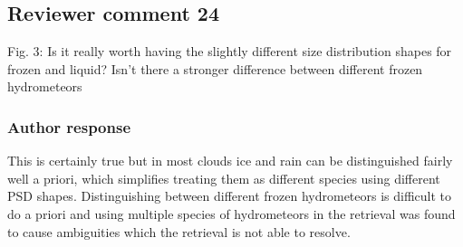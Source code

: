 \documentclass[11pt]{scrartcl}
\begin{document}
%
%
%


\subsection*{Reviewer comment 24}

Fig.  3: Is it really worth having the slightly different size distribution shapes for frozen and liquid? Isn’t there a stronger difference between different frozen hydrometeors

\subsubsection*{Author response}

This is certainly true but in most clouds ice and rain can be distinguished
fairly well a priori, which simplifies treating them as different species
using different PSD shapes. Distinguishing between different frozen hydrometeors is
difficult to do a priori and using multiple species of hydrometeors in the
retrieval was found to cause ambiguities which the retrieval is not able to
resolve.


\end{document}
